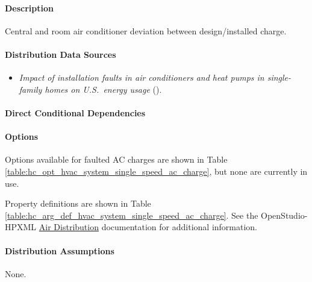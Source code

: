 \paragraph{Description}
% 
Central and room air conditioner deviation between design/installed charge.

\paragraph{Distribution Data Sources}
% 
\begin{itemize}
\item 

\textit{Impact of installation faults in air conditioners and heat pumps in single-family homes on U.S.~energy usage} (\cite{Winkler2020}).

\end{itemize}

\paragraph{Direct Conditional Dependencies}


\paragraph{Options}
Options available for faulted AC charges are shown in Table \ref{table:hc_opt_hvac_system_single_speed_ac_charge}, but none are currently in use.



Property definitions are shown in Table \ref{table:hc_arg_def_hvac_system_single_speed_ac_charge}. See the OpenStudio-HPXML \href{https://openstudio-hpxml.readthedocs.io/en/v1.10.0/workflow_inputs.html#hpxml-air-distribution}{Air Distribution} documentation for additional information.



\paragraph{Distribution Assumptions}
% 
None.
